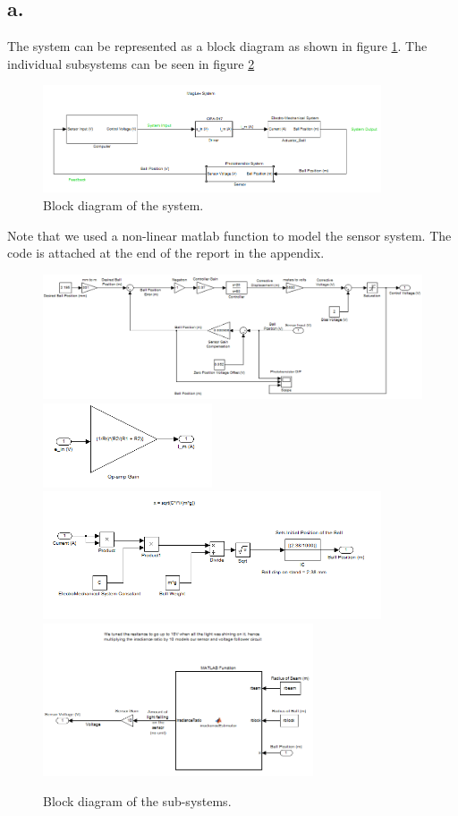 \documentclass{article}
\theoremstyle{plain}
\theoremstyle{definition}
\theoremstyle{remark}
\begin{document}
\subsection*{a.}
The system can be represented as a block diagram as shown in figure \ref{q1_a1}. The individual subsystems can be seen in figure \ref{q1_a2}
\begin{figure}[h]
\begin{center}
\includegraphics[width=10cm]{MagLevSystem.png}
\end{center}
\caption{Block diagram of the system.}
\label{q1_a1}
\end{figure}

Note that we used a non-linear matlab function to model the sensor system. The code is attached at the end of the report in the appendix.

\begin{figure}[h]
\begin{center}
\includegraphics[width=15cm]{Computer.png}
\includegraphics[width=5cm]{OpAmp.png}
\includegraphics[width=10cm]{Actuator_Ball.png}
\includegraphics[width=8cm]{Sensor.png}
\end{center}
\caption{Block diagram of the sub-systems.}
\label{q1_a2}
\end{figure}
\end{document}
